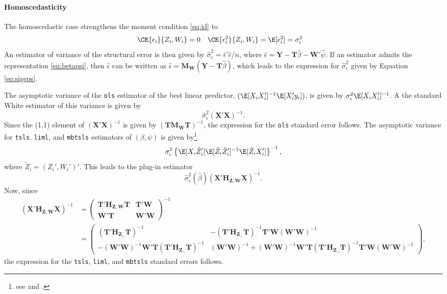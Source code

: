 \documentclass{mynotes}
\newcommand{\by}{\mathbf{Y}} %
\newcommand{\bx}{\mathbf{X}} %
\newcommand{\bt}{\mathbf{T}} %
\newcommand{\bz}{\mathbf{Z}} %
\newcommand{\bw}{\mathbf{W}} %
\newcommand{\Hm}[1]{\mathbf{H}_{#1}} %
\newcommand{\Mm}[1]{\mathbf{M}_{#1}} %
\begin{document}
\begin{appendices}
\paragraph{Homoscedasticity}
The homoscedastic case strengthens the moment condition \eqref{eq:id} to
\begin{align*}
  \CE{\epsilon_{i}}{Z_{i},W_{i}}&=0&
  \CE{\epsilon_{i}^{2}}{Z_{i},W_{i}}&=\E[\epsilon^{2}_{i}]=\sigma^{2}_{\epsilon}
\end{align*}
An estimator of variance of the structural error is then given by
$\hat{\sigma}^{2}_{\epsilon}=\hat{\epsilon}'\hat{\epsilon}/n$, where
$\hat{\epsilon}=\by-\bt\hat{\beta}-\bw'\hat{\psi}$. If an estimator admits the
representation \eqref{eq:betapsi}, then $\hat{\epsilon}$ can be written as
$\hat{\epsilon}=\Mm{\bw}(\by-\bt\hat{\beta})$, which leads to the expression for
$\hat{\sigma}^{2}_{\epsilon}$ given by Equation \eqref{eq:sigeps}.

The asymptotic variance of the \texttt{ols} estimator of the best linear
predictor, $(\E[X_{i}X_{i}']^{-1}\E[X_{i}'y_{i}])$, is given by
$\sigma_{\epsilon}^{2}\E[X_{i}X_{i}']^{-1}$. A the standard White estimator of
this variance is given by
\begin{equation*}
  \hat{\sigma}^{2}_{\epsilon}(\bx'\bx)^{-1}.
\end{equation*}
Since the (1,1) element of $(\bx'\bx)^{-1}$ is given by $(\bt\Mm{\bw}\bt)^{-1}$,
the expression for the \texttt{ols} standard error follows. The asymptotic
variance for \texttt{tsls}, \texttt{liml}, and \texttt{mbtsls} estimators of
$(\beta,\psi)$ is given by\footnote{see \citet[Equation 5.24]{wooldridge02} and
\citet{dm93}.}
\begin{equation*}
  \sigma^{2}_{\epsilon}\left\{\E[X_{i}\tilde{Z}_{i}']
    \E[\tilde{Z}_{i}\tilde{Z}_{i}']^{-1}\E[\tilde{Z}_{i}X_{i}']\right\}^{-1},
\end{equation*}
where $\tilde{Z}_{i}=(Z_{i}',W_{i}')'$. This leads to the plug-in estimator
\begin{equation*}
  \hat{\sigma}^{2}_{\epsilon}(\hat{\beta})(\bx' \Hm{\bz,\bw}\bx)^{-1}.
\end{equation*}
Now, since
\begin{equation*}
  \begin{split}
    (\bx'\Hm{\bz,\bw}\bx)^{-1}&=
    \begin{pmatrix}
      \bt'\Hm{\bz,\bw}\bt & \bt'\bw\\
      \bw'\bt & \bw'\bw
    \end{pmatrix}^{-1}\\
    &=
    \begin{pmatrix}
      (\bt'\Hm{\bz_{\perp}}\bt)^{-1} & -  (\bt'\Hm{\bz_{\perp}}\bt)^{-1}\bt'\bw(\bw'\bw)^{-1}\\
      -(\bw'\bw)^{-1}\bw'\bt (\bt'\Hm{\bz_{\perp}}\bt)^{-1}& (\bw'\bw)^{-1}+
      (\bw'\bw)^{-1}\bw'\bt (\bt'\Hm{\bz_{\perp}}\bt)^{-1}\bt'\bw(\bw'\bw)^{-1}
    \end{pmatrix},
  \end{split}
\end{equation*}
the expression for the \texttt{tsls}, \texttt{liml}, and \texttt{mbtsls}
standard errors follows.


\end{appendices}
\end{document}
